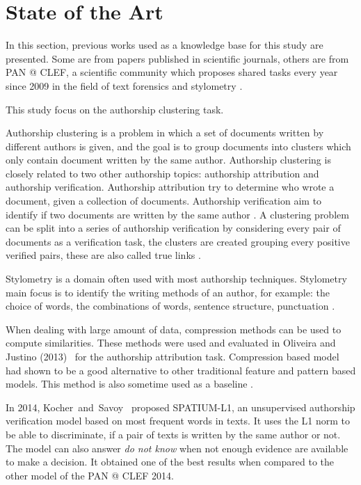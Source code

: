 \chapter{State of the Art \label{sec:state_of_the_art}}

In this section, previous works used as a knowledge base for this study are presented.
Some are from papers published in scientific journals, others are from PAN @ CLEF, a scientific community which proposes shared tasks every year since 2009 in the field of text forensics and stylometry \cite{pan_webis}.

This study focus on the authorship clustering task.

Authorship clustering is a problem in which a set of documents written by different authors is given, and the goal is to group documents into clusters which only contain document written by the same author.
Authorship clustering is closely related to two other authorship topics: authorship attribution and authorship verification.
Authorship attribution try to determine who wrote a document, given a collection of documents.
Authorship verification aim to identify if two documents are written by the same author \cite{pan11_verif}.
A clustering problem can be split into a series of authorship verification by considering every pair of documents as a verification task, the clusters are created grouping every positive verified pairs, these are also called true links \cite{pan16_clustering_site}.

Stylometry is a domain often used with most authorship techniques.
Stylometry main focus is to identify the writing methods of an author, for example: the choice of words, the combinations of words, sentence structure, punctuation \cite{savoy_stylo}.

When dealing with large amount of data, compression methods can be used to compute similarities.
These methods were used and evaluated in Oliveira and Justino (2013)~\cite{comparing_compression} for the authorship attribution task.
Compression based model had shown to be a good alternative to other traditional feature and pattern based models.
This method is also sometime used as a baseline \cite{overview_pan20}.

In 2014, Kocher~and~Savoy~\cite{kocher_linking} proposed SPATIUM-L1, an unsupervised authorship verification model based on most frequent words in texts.
It uses the L1 norm to be able to discriminate, if a pair of texts is written by the same author or not.
The model can also answer \textit{do not know} when not enough evidence are available to make a decision.
It obtained one of the best results when compared to the other model of the PAN @ CLEF 2014.

